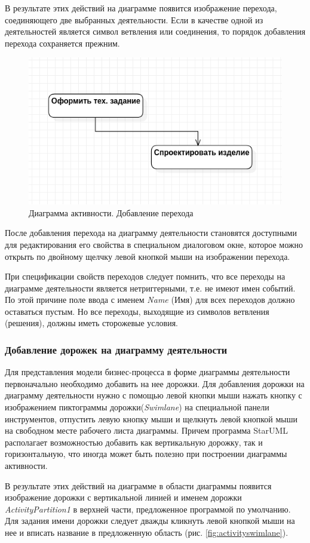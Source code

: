 \documentclass[a4paper,12pt]{extreport}
\newcommand{\staruml}{StarUML\,\tm}
\begin{document}
В результате этих действий на диаграмме появится изображение перехода, соединяющего две выбранных деятельности. Если в качестве одной из деятельностей является символ ветвления или соединения, то порядок добавления перехода сохраняется прежним.
\begin{figure}[h!]
	\centering
	\includegraphics[width=0.6\linewidth]{images/activityflow}
	\caption{Диаграмма активности. Добавление перехода}
	\label{fig:activityflow}
\end{figure}

После добавления перехода на диаграмму деятельности становятся доступными для редактирования его свойства в специальном диалоговом окне, которое можно открыть по двойному щелчку левой кнопкой мыши на изображении перехода.

При спецификации свойств переходов следует помнить, что все переходы на диаграмме деятельности является нетриггерными, т.е. не имеют имен событий. По этой причине поле ввода с именем \textit{Name} (Имя) для всех переходов должно оставаться пустым. Но все переходы, выходящие из символов ветвления (решения), должны иметь сторожевые условия.
\subsubsection*{Добавление дорожек на диаграмму деятельности}	
Для представления модели бизнес-процесса в форме диаграммы деятельности первоначально необходимо добавить на нее дорожки. Для добавления дорожки на диаграмму деятельности нужно с помощью левой кнопки мыши нажать кнопку с изображением пиктограммы дорожки(\textit{Swimlane}) на специальной панели инструментов, отпустить левую кнопку мыши и щелкнуть левой кнопкой мыши на свободном месте рабочего листа диаграммы. Причем программа \staruml располагает возможностью добавить как вертикальную дорожку, так и горизонтальную, что иногда может быть полезно при построении диаграммы активности.

В результате этих действий на диаграмме в области диаграммы появится изображение дорожки с вертикальной линией и именем дорожки \textit{ActivityPartition1} в верхней части, предложенное программой по умолчанию. Для задания имени дорожки следует дважды кликнуть левой кнопкой мыши на нее и вписать название в предложенную область (рис. \ref{fig:activityswimlane}).
\end{document}
